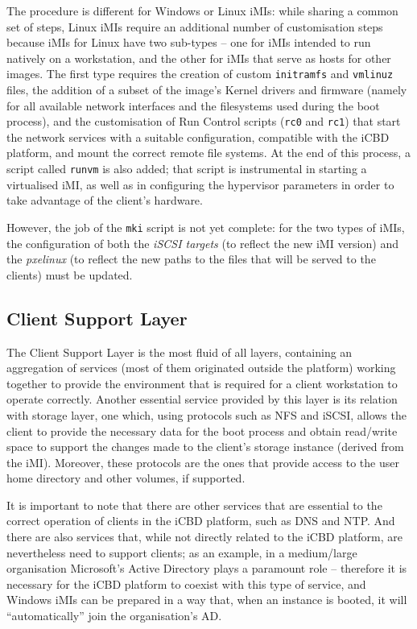 The procedure is different for Windows or Linux iMIs: while sharing a common set of steps, Linux iMIs require an additional number of customisation steps because iMIs for Linux have two sub-types – one for iMIs intended to run natively on a workstation, and the other for iMIs that serve as hosts for other images. The first type requires the creation of custom \texttt{initramfs} and \texttt{vmlinuz} files, the addition of a subset of the image's Kernel drivers and firmware (namely for all available network interfaces and the filesystems used during the boot process), and the customisation of Run Control scripts (\texttt{rc0} and \texttt{rc1}) that start the network services with a suitable configuration, compatible with the iCBD platform, and mount the correct remote file systems. At the end of this process, a script called \texttt{runvm} is also added; that script is instrumental in starting a virtualised iMI, as well as in configuring the hypervisor parameters in order to take advantage of the client’s hardware.

However, the job of the \texttt{mki} script is not yet complete: for the two types of iMIs, the configuration of both the \textit{iSCSI targets} (to reflect the new iMI version) and the \textit{pxelinux} (to reflect the new paths to the files that will be served to the clients) must be updated.


\subsection{Client Support Layer}
\label{sub:icbd_client_support_layer}

The Client Support Layer is the most fluid of all layers, containing an aggregation of services (most of them originated outside the platform) working together to provide the environment that is required for a client workstation to operate correctly. Another essential service provided by this layer is its relation with storage layer, one which, using protocols such as NFS and iSCSI, allows the client to provide the necessary data for the boot process and obtain read/write space to support the changes made to the client’s storage instance (derived from the iMI). Moreover, these protocols are the ones that provide access to the user home directory and other volumes, if supported.

It is important to note that there are other services that are essential to the correct operation of clients in the iCBD platform, such as DNS and NTP. And there are also services that, while not directly related to the iCBD platform, are nevertheless need to support clients; as an example, in a medium/large organisation Microsoft’s Active Directory plays a paramount role – therefore it is necessary for the iCBD platform to coexist with this type of service, and Windows iMIs can be prepared in a way that, when an instance is booted, it will “automatically” join the organisation’s AD.

